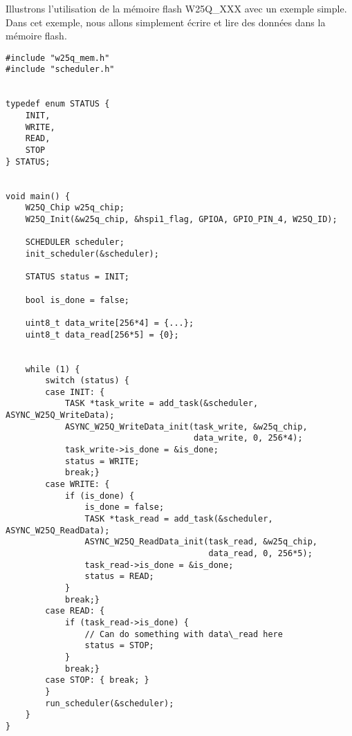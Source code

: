 Illustrons l'utilisation de la mémoire flash W25Q\_XXX avec un exemple simple. Dans
cet exemple, nous allons simplement écrire et lire des données dans la mémoire flash.

\begin{lstlisting}[style=prog, frame=shadowbox, caption={Exemple d'utilisation de la mémoire flash W25Q\_XXX}, label={lst:w25q_example},
    emph={[1]main, W25Q_Init, ASYNC_W25Q_WriteData_init, ASYNC_W25Q_WriteData, ASYNC_W25Q_ReadData_init, ASYNC_W25Q_ReadData, init_scheduler, add_task, run_scheduler}, emphstyle={[1]\color{C}},
    emph={[2]STATUS, W25Q_Chip, SCHEDULER, TASK}, emphstyle={[2]\color{E}}]
#include "w25q_mem.h"
#include "scheduler.h"


typedef enum STATUS {
    INIT,
    WRITE,
    READ,
    STOP
} STATUS;


void main() {
    W25Q_Chip w25q_chip;
    W25Q_Init(&w25q_chip, &hspi1_flag, GPIOA, GPIO_PIN_4, W25Q_ID);
    
    SCHEDULER scheduler;
    init_scheduler(&scheduler);

    STATUS status = INIT;

    bool is_done = false;

    uint8_t data_write[256*4] = {...};
    uint8_t data_read[256*5] = {0};


    while (1) {
        switch (status) {
        case INIT: {
            TASK *task_write = add_task(&scheduler, ASYNC_W25Q_WriteData);
            ASYNC_W25Q_WriteData_init(task_write, &w25q_chip,
                                      data_write, 0, 256*4);
            task_write->is_done = &is_done;
            status = WRITE;
            break;}
        case WRITE: {
            if (is_done) {
                is_done = false;
                TASK *task_read = add_task(&scheduler, ASYNC_W25Q_ReadData);
                ASYNC_W25Q_ReadData_init(task_read, &w25q_chip,
                                         data_read, 0, 256*5);
                task_read->is_done = &is_done;
                status = READ;
            }
            break;}
        case READ: {
            if (task_read->is_done) {
                // Can do something with data\_read here
                status = STOP;
            }
            break;}
        case STOP: { break; }
        }
        run_scheduler(&scheduler);
    }
}
\end{lstlisting}



